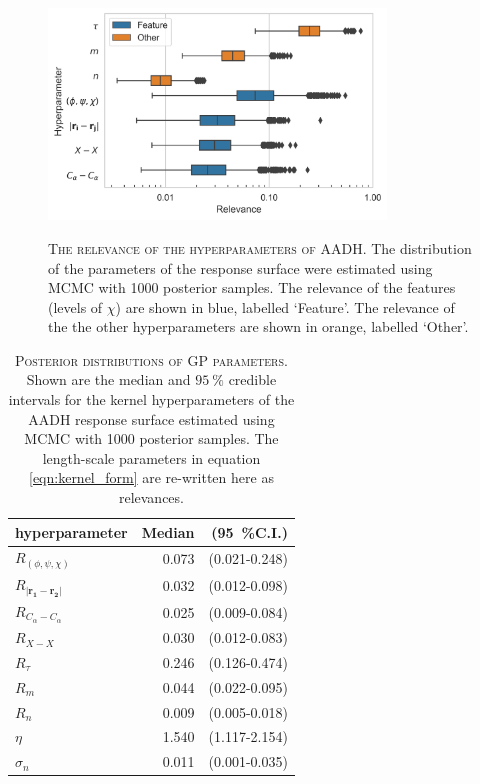 \begin{figure}
    \centering
    \caption[The relevance of the hyperparameters of AADH]{\textsc{The relevance of the hyperparameters of AADH}. The distribution of the parameters of the response surface were estimated using MCMC with \num{1000} posterior samples. The relevance of the features (levels of $\chi$) are shown in blue, labelled `Feature'. The relevance of the the other hyperparameters are shown in orange, labelled `Other'.}
    \includegraphics[width=0.8\textwidth]{chapters/msm_optimization/figures/AADH_relevance_d.png}
    \label{fig:aadh_relevance}
\end{figure}

\begin{table}
    \centering
    \caption[Posterior distributions of GP parameters]{\textsc{Posterior distributions of GP parameters}. Shown are the median and $\SI{95}{\percent}$ credible intervals for the kernel hyperparameters of the AADH response surface estimated using MCMC with \num{1000} posterior samples. The length-scale parameters in equation \ref{eqn:kernel_form} are re-written here as relevances.}
    \begin{tabular}{|l|r|r|}
    \hline
                             hyperparameter &  Median &     (\SI{95}{\percent}C.I.) \\
    \hline\hline
                    $R_{(\phi, \psi, \chi)}$ &   0.073 &  (0.021-0.248) \\
     $R_{|\mathbf{r_{1}} - \mathbf{r_{2}}|}$ &   0.032 &  (0.012-0.098) \\
                 $R_{C_{\alpha}-C_{\alpha}}$ &   0.025 &  (0.009-0.084) \\
                                   $R_{X-X}$ &   0.030 &  (0.012-0.083) \\
                                  $R_{\tau}$ &   0.246 &  (0.126-0.474) \\
                                     $R_{m}$ &   0.044 &  (0.022-0.095) \\
                                     $R_{n}$ &   0.009 &  (0.005-0.018) \\
                                      $\eta$ &   1.540 &  (1.117-2.154) \\
                                  $\sigma_n$ &   0.011 &  (0.001-0.035) \\
    \hline
    \end{tabular}
    \label{tab:aadh_rel}
\end{table}

